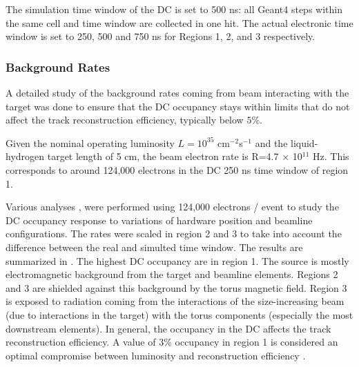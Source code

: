 The simulation time window of the DC is set to 500 ns: all Geant4 steps within the same cell and time window are collected in one hit.
The actual electronic time window is set to 250, 500 and 750 ns for Regions 1, 2, and 3 respectively. 


\subsubsection{Background Rates}

A detailed study of the background rates coming from beam interacting with the target was done to ensure that the DC occupancy stays
within limits that do not affect the track reconstruction efficiency, typically below $5\%$.

Given the nominal operating luminosity $L=10^{35}$ cm$^{-2}$s$^{-1}$ and the liquid-hydrogen target length of 5 cm, the beam electron rate
is R=4.7 $\times$ 10$^{11}$ Hz. This corresponds to around 124,000 electrons in the DC 250 ns time window of region 1.

Various analyses \cite{targetStudy, clas12Beamline, clas12Background}, were performed using 124,000 electrons / event
to study the DC occupancy response to variations of hardware position and beamline configurations. The rates were scaled in region 2 and 3 to take into account the
difference between the real and simulted time window.
The results are summarized in . The highest DC occupancy are in region 1. The source is mostly electromagnetic background from the target
and beamline elements. Regions 2 and 3 are shielded against this background by the torus magnetic field. Region 3 is exposed to radiation coming from
the interactions of the size-increasing beam (due to interactions in the target) with the torus components (especially the most downstream elements).
In general, the occupancy in the DC affects the track reconstruction efficiency. A value of 3$\%$ occupancy in region 1
is considered an optimal compromise between luminosity and reconstruction efficiency \cite{recon-nim}.

